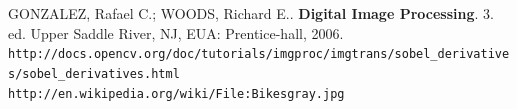 \documentclass[10pt,a4paper]{article}
\begin{document}
\begin{thebibliography}{99}
     GONZALEZ, Rafael C.; WOODS, Richard E.. \textbf{Digital Image Processing}. 3. ed. Upper Saddle River, NJ, EUA: Prentice-hall, 2006.
     \texttt{http://docs.opencv.org/doc/tutorials/imgproc/imgtrans/sobel\_derivatives/sobel\_derivatives.html}
     \texttt{http://en.wikipedia.org/wiki/File:Bikesgray.jpg}
\end{thebibliography}
\end{document}
